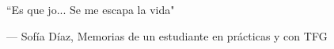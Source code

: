 
\epigraph{``Es que jo... Se me escapa la vida"}{--- \textup{Sof\'ia D\'iaz}, Memorias de un estudiante en pr\'acticas y con TFG}

